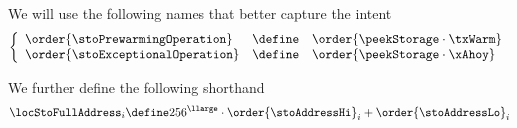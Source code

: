 \saNote{} \label{hub: consistencies: storage: better names for prewarming and exceptional operation columns}
We will use the following names that better capture the intent
\[
	\left\{ \begin{array}{lcl}
		\order{\stoPrewarmingOperation}  & \define & \order{\peekStorage \cdot \txWarm} \\
                \order{\stoExceptionalOperation} & \define & \order{\peekStorage \cdot \xAhoy}  \\
	\end{array} \right.
\]

We further define the following shorthand
\[
	\locStoFullAddress_{i}
	\define
	256^\llarge \cdot \order{\stoAddressHi}_{i} + \order{\stoAddressLo}_{i}
\]
